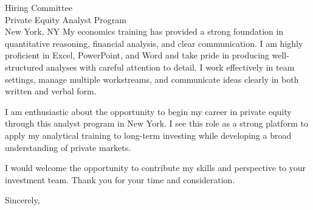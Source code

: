 \documentclass[11pt]{letter}
\begin{document}
\begin{letter}{Hiring Committee \\ Private Equity Analyst Program \\ New York, NY}
My economics training has provided a strong foundation in quantitative reasoning, financial analysis, and clear communication. I am highly proficient in Excel, PowerPoint, and Word and take pride in producing well-structured analyses with careful attention to detail. I work effectively in team settings, manage multiple workstreams, and communicate ideas clearly in both written and verbal form.

I am enthusiastic about the opportunity to begin my career in private equity through this analyst program in New York. I see this role as a strong platform to apply my analytical training to long-term investing while developing a broad understanding of private markets.

I would welcome the opportunity to contribute my skills and perspective to your investment team. Thank you for your time and consideration.

\closing{Sincerely,}

\end{letter}
\end{document}
